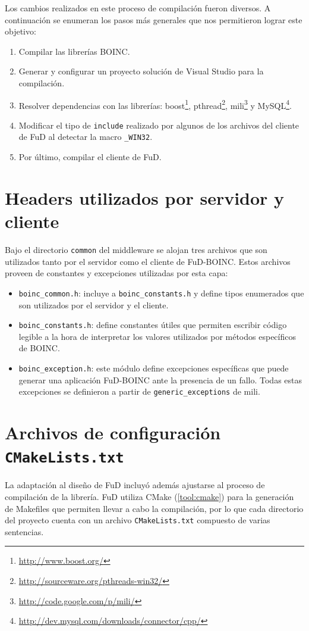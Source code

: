 Los cambios realizados en este proceso de compilación fueron diversos. A continuación se enumeran los pasos más generales que nos permitieron lograr este objetivo:

\begin{enumerate}
\item Compilar las librerías BOINC.
\item Generar y configurar un proyecto solución de Visual Studio para la compilación.
\item Resolver dependencias con las librerías: boost\footnote{\url{http://www.boost.org/}}, pthread\footnote{\url{http://sourceware.org/pthreads-win32/}}, mili\footnote{\url{http://code.google.com/p/mili/}} y MySQL\footnote{\url{http://dev.mysql.com/downloads/connector/cpp/}}.
\item Modificar el tipo de \texttt{include} realizado por algunos de los archivos del cliente de FuD al detectar la macro \texttt{\_WIN32}.
\item Por último, compilar el cliente de FuD.
\end{enumerate}

	
\section{Headers utilizados por servidor y cliente}
Bajo el directorio \texttt{common} del middleware se alojan tres archivos que son utilizados tanto por el servidor como el cliente de FuD-BOINC. Estos archivos proveen de constantes y excepciones utilizadas por esta capa:
	\begin{itemize}
		\item \texttt{boinc\_common.h}: incluye a \texttt{boinc\_constants.h} y define tipos enumerados que son utilizados por el servidor y el cliente.
		\item \texttt{boinc\_constants.h}: define constantes útiles que permiten escribir código legible a la hora de interpretar los valores utilizados por métodos específicos de BOINC.
		\item \texttt{boinc\_exception.h}: este módulo define excepciones específicas que puede generar una aplicación FuD-BOINC ante la presencia de un fallo. Todas estas excepciones se definieron a partir de \texttt{generic\_exceptions} de mili.
\end{itemize}


\section{Archivos de configuración \texttt{CMakeLists.txt}}
La adaptación al diseño de FuD incluyó además ajustarse al proceso de compilación de la librería. FuD utiliza CMake (\ref{tool:cmake}) para la generación de Makefiles que permiten llevar a cabo la compilación, por lo que cada directorio del proyecto cuenta con un archivo \texttt{CMakeLists.txt} compuesto de varias sentencias. 

